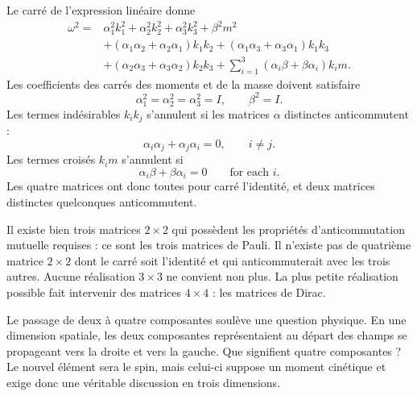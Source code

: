 Le carré de l’expression linéaire donne
\begin{align}
\omega^2
={}&
\alpha_1^2k_1^2+\alpha_2^2k_2^2+\alpha_3^2k_3^2+\beta^2m^2
\nonumber\\
&+(\alpha_1\alpha_2+\alpha_2\alpha_1)k_1k_2
+(\alpha_1\alpha_3+\alpha_3\alpha_1)k_1k_3
\nonumber\\
&+(\alpha_2\alpha_3+\alpha_3\alpha_2)k_2k_3
+\sum_{i=1}^{3}(\alpha_i\beta+\beta\alpha_i)k_i m.
\end{align}
Les coefficients des carrés des moments et de la masse doivent satisfaire
\begin{equation}
\alpha_1^2=\alpha_2^2=\alpha_3^2=I,
\qquad
\beta^2=I.
\end{equation}
Les termes indésirables \(k_i k_j\) s’annulent si les matrices \(\alpha\) distinctes anticommutent :
\begin{equation}
\alpha_i\alpha_j+\alpha_j\alpha_i=0,
\qquad i\neq j.
\end{equation}
Les termes croisés \(k_i m\) s’annulent si
\begin{equation}
\alpha_i\beta+\beta\alpha_i=0
\qquad
\text{for each }i.
\end{equation}
Les quatre matrices ont donc toutes pour carré l’identité, et deux matrices distinctes quelconques anticommutent.

Il existe bien trois matrices \(2\times2\) qui possèdent les propriétés d’anticommutation mutuelle requises : ce sont les trois matrices de Pauli. Il n’existe pas de quatrième matrice \(2\times2\) dont le carré soit l’identité et qui anticommuterait avec les trois autres. Aucune réalisation \(3\times3\) ne convient non plus. La plus petite réalisation possible fait intervenir des matrices \(4\times4\) : les matrices de Dirac.

Le passage de deux à quatre composantes soulève une question physique. En une dimension spatiale, les deux composantes représentaient au départ des champs se propageant vers la droite et vers la gauche. Que signifient quatre composantes ? Le nouvel élément sera le spin, mais celui-ci suppose un moment cinétique et exige donc une véritable discussion en trois dimensions.

